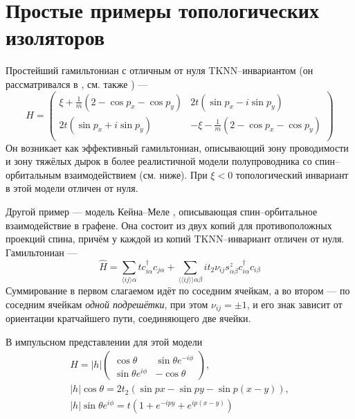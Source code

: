 \section{Простые примеры топологических изоляторов}
Простейший гамильтониан с отличным от нуля $\mathrm{TKNN}$--инвариантом 
(он рассматривался в \cite{Qi2006}, см. также \cite{Bernevig2006}) ---
\begin{equation}
    \label{eff_so_ham}
    H = \left(\begin{matrix}
            \xi + \frac{1}{m}(2 - \cos{p_x} - \cos{p_y}) & 2t(\sin{p_x} - i\sin{p_y})   \\
            2t(\sin{p_x} + i\sin{p_y}) & - \xi - \frac{1}{m}(2 - \cos{p_x} - \cos{p_y}) \\
        \end{matrix}\right)
\end{equation}
Он возникает как эффективный гамильтониан, описывающий зону проводимости и зону
тяжёлых дырок в более реалистичной модели полупроводника со спин--орбитальным
взаимодействием (см. ниже). При $\xi < 0$ топологический инвариант в этой модели отличен
от нуля.

Другой пример --- модель Кейна--Меле \cite{Kane2005}, 
описывающая спин--орбитальное взаимодействие в 
графене. Она состоит из двух копий для противоположных проекций спина, причём у каждой
из копий $\mathrm{TKNN}$--инвариант отличен от нуля. Гамильтониан --- 
\begin{equation}
		\hat{H} = 
			\sum_{\langle ij \rangle \alpha} t c^\dagger_{i\alpha} c_{j\alpha} + 
				\sum_{\langle\langle ij \rangle\rangle \alpha\beta} 
					it_2 \nu_{ij} s^z_{\alpha \beta} c^\dagger_{i\alpha} c_{i\beta}
\end{equation}
Суммирование в первом слагаемом идёт по соседним ячейкам, а во втором --- по соседним
ячейкам \emph{одной подрешётки}, при этом $\nu_{ij} = \pm 1$, и его знак зависит
от ориентации кратчайшего пути, соединяющего две ячейки.

В импульсном представлении для этой модели
\begin{equation}
    \begin{gathered}
    	H = |h|\left(
            \begin{matrix}
                \cos{\theta} & \sin{\theta}e^{-i\phi} \\
                \sin{\theta}e^{i\phi} & -\cos{\theta}
            \end{matrix}
    	\right),\\
    	|h|\cos{\theta} = 2t_2 (\sin{px} - \sin{py} - \sin{p(x-y)}), \\
    	|h|\sin{\theta}e^{i\phi} = t(1 + e^{-ipy} + e^{ip(x-y)}) 
    \end{gathered}
\end{equation}
